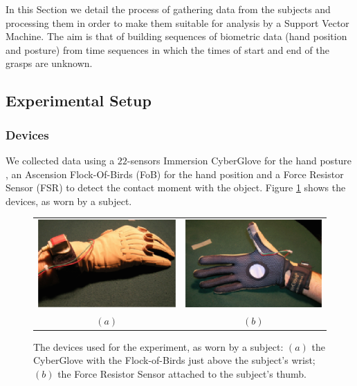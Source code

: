 In this Section we detail the process of gathering data from the
subjects and processing them in order to make them suitable for
analysis by a Support Vector Machine. The aim is that of building
sequences of biometric data (hand position and posture) from time
sequences in which the times of start and end of the grasps are
unknown.

\subsection{Experimental Setup}

\subsubsection*{Devices}

We collected data using a $22$-sensors Immersion CyberGlove for the
hand posture \cite{cyberglove}, an Ascension Flock-Of-Birds (FoB) for
the hand position \cite{fob} and a Force Resistor Sensor (FSR) to
detect the contact moment with the object. Figure \ref{fig:devices}
shows the devices, as worn by a subject.

\begin{figure}[htbp]
  \begin{center}
    \begin{tabular}{cc}
      \includegraphics[width=0.45\linewidth]{devices1.eps} &
      \includegraphics[width=0.45\linewidth]{devices2.eps} \\
      $(a)$ & $(b)$
    \end{tabular}
    \caption{The devices used for the experiment, as worn by a
    subject: $(a)$ the CyberGlove with the Flock-of-Birds just above
    the subject's wrist; $(b)$ the Force Resistor Sensor attached to
    the subject's thumb.}
    \label{fig:devices}
  \end{center}
\end{figure}

